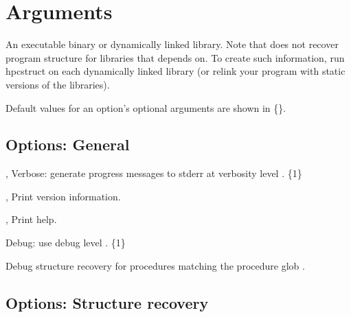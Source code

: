\documentclass[english]{article}
\begin{document}
\section{Arguments}

\begin{Description}
\item[\Arg{binary}] An executable binary or dynamically linked library.
Note that  does not recover program structure for libraries that  depends on.  To create such information, run hpcstruct on each dynamically linked library (or relink your program with static versions of the libraries).
\end{Description}

Default values for an option's optional arguments are shown in \{\}.

\subsection{Options: General}

\begin{Description}
\item[\OptoArg{-v}{n}, \OptoArg{--verbose}{n}]
Verbose: generate progress messages to stderr at verbosity level .  \{1\}

\item[\Opt{-V}, \Opt{--version}]
Print version information.

\item[\Opt{-h}, \Opt{--help}]
Print help.

\item[\OptoArg{--debug}{n}]
Debug: use debug level . \{1\}

\item[\OptArg{--debug-proc}{glob}]
Debug structure recovery for procedures matching the procedure glob .
\end{Description}


\subsection{Options: Structure recovery}
\end{document}
